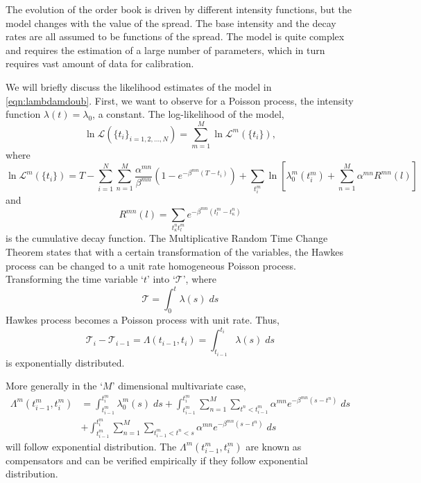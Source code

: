 The evolution of the order book is driven by different intensity functions, but the model changes with the value of the spread. The base intensity and the decay rates are all assumed to be functions of the spread. The model is quite complex and requires the estimation of a large number of parameters, which in turn requires vast amount of data for calibration. 


We will briefly discuss the likelihood estimates of the model in \eqref{eqn:lambdamdoub}. First, we want to observe for a Poisson process, the intensity function $\lambda(t)=\lambda_0$, a constant. The log-likelihood of the model,
	\begin{equation}\label{eqn:loglikemod}
	\ln \mathcal{L}(\{t_i\}_{i=1,2,\ldots,N}) = \sum_{m=1}^M \ln \mathcal{L}^m(\{t_i\}),
	\end{equation}
where
	\[
	\ln \mathcal{L}^m(\{t_i\})= T - \sum_{i=1}^N \sum_{n=1}^M \dfrac{\alpha^{mn}}{\beta^{mn}} (1- e^{-\beta^{mn}(T-t_i)}) + \sum_{t_i^m} \ln[ \lambda_0^m(t_i^m) + \sum_{n=1}^M \alpha^{mn} R^{mn}(l) ]
	\]
and 
	\[
	R^{mn}(l)= \sum_{t_\kappa^n t_l^m} e^{-\beta^{mn}(t_l^m-t_\kappa^n)}
	\]
is the cumulative decay function. The Multiplicative Random Time Change Theorem states that with a certain transformation of the variables, the Hawkes process can be changed to a unit rate homogeneous Poisson process. Transforming the time variable `$t$' into `$\mathcal{T}$', where
	\begin{equation} \label{eqn:calt}
	\mathcal{T}= \int_0^t \lambda(s) \; ds
	\end{equation}
Hawkes process becomes a Poisson process with unit rate. Thus,
	\begin{equation} \label{eqn:diffcalt}
	\mathcal{T}_i - \mathcal{T}_{i-1}= \Lambda(t_{i-1},t_i) = \int_{t_{i-1}}^{t_i} \lambda(s) \; ds
	\end{equation}
is exponentially distributed. 


More generally in the `$M$' dimensional multivariate case,
	\[
	\begin{aligned}
	\Lambda^m(t_{i-1}^m,t_i^m)&= \int_{t_{i-1}^m}^{t_i^m} \lambda_0^m(s) \; ds + \int_{t_{i-1}^m}^{t_i^m} \sum_{n=1}^M \sum_{t^n<t_{i-1}^m} \alpha^{mn} e^{-\beta^{mn}(s-t^n)} \; ds \\
	&+ \int_{t_{i-1}^m}^{t_i^m} \sum_{n=1}^M \sum_{t_{i-1}^m<t^n<s} \alpha^{mn} e^{-\beta^{mn}(s-t^n)} \; ds
	\end{aligned}
	\]
will follow exponential distribution. The $\Lambda^m(t_{i-1}^m,t_i^m)$ are known as compensators and can be verified empirically if they follow exponential distribution. \twomedskip


